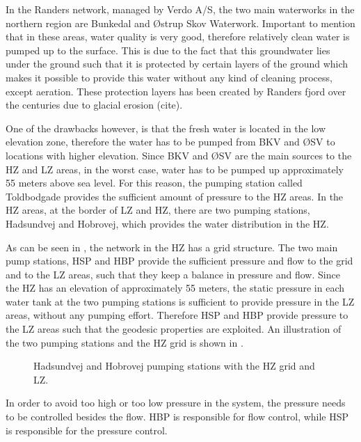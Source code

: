 In the Randers network, managed by Verdo A/S, the two main waterworks in the northern region are Bunkedal and Østrup Skov Waterwork. Important to mention that in these areas, water quality is very good, therefore relatively clean water is pumped up to the surface. This is due to the fact that this groundwater lies under the ground such that it is protected by certain layers of the ground which makes it possible to provide this water without any kind of cleaning process, except aeration. These protection layers has been created by Randers fjord over the centuries due to glacial erosion (cite).

One of the drawbacks however, is that the fresh water is located in the low elevation zone, therefore the water has to be pumped from BKV and ØSV to locations with higher elevation. Since BKV and ØSV are the main sources to the HZ and LZ areas, in the worst case, water has to be pumped up approximately 55 meters above sea level. For this reason, the pumping station called Toldbodgade provides the sufficient amount of pressure to the HZ areas. In the HZ areas, at the border of LZ and HZ, there are two pumping stations, Hadsundvej and Hobrovej, which provides the water distribution in the HZ. 

As can be seen in , the network in the HZ has a grid structure. The two main pump stations, HSP and HBP provide the sufficient pressure and flow to the grid and to the LZ areas, such that they keep a balance in pressure and flow. Since the HZ has an elevation of approximately 55 meters, the static pressure in each water tank at the two pumping stations is sufficient to provide pressure in the LZ areas, without any pumping effort. Therefore HSP and HBP provide pressure to the LZ areas such that the geodesic properties are exploited. An illustration of the two pumping stations and the HZ grid is shown in . 

\begin{figure}[H]
\centering

\caption{Hadsundvej and Hobrovej pumping stations with the HZ grid and LZ.}
\label{fig:HBP_HSP_grid}
\end{figure}

In order to avoid too high or too low pressure in the system, the pressure needs to be controlled besides the flow. HBP is responsible for flow control, while HSP is responsible for the pressure control. 

